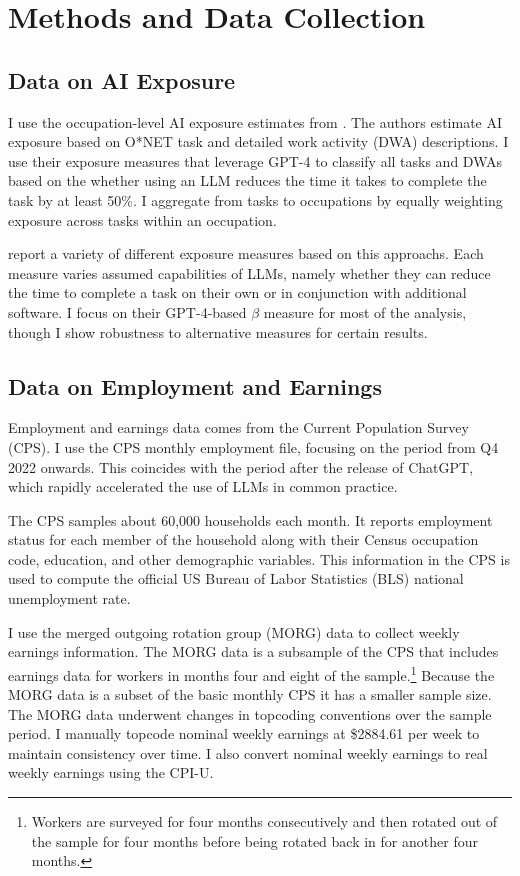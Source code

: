 \documentclass[12pt]{article}
\numberwithin{equation}{section}
\theoremstyle{theorem}\newcustomtheorem{theorem}{{\bf\sc Theorem}}
\theoremstyle{definition}\newcustomtheorem{assumption}{{\bf\sc Assumption}}
\theoremstyle{theorem} \newcustomtheorem{proposition}{{\bf\sc Proposition}}
\begin{document}
\section{Methods and Data Collection} 

\subsection{Data on AI Exposure}

I use the occupation-level AI exposure estimates from \citet{eloundou_gpts_2023}. The authors estimate AI exposure based on O*NET task and detailed work activity (DWA) descriptions. I use their exposure measures that leverage GPT-4 to classify all tasks and DWAs based on the whether using an LLM reduces the time it takes to complete the task by at least 50\%. I aggregate from tasks to occupations by equally weighting exposure across tasks within an occupation. 

\citet{eloundou_gpts_2023} report a variety of different exposure measures based on this approachs. Each measure varies assumed capabilities of LLMs, namely whether they can reduce the time to complete a task on their own or in conjunction with additional software. I focus on their GPT-4-based $\beta$ measure for most of the analysis, though I show robustness to alternative measures for certain results.  

\subsection{Data on Employment and Earnings}

Employment and earnings data comes from the Current Population Survey (CPS). I use the CPS monthly employment file, focusing on the period from Q4 2022 onwards. This coincides with the period after the release of ChatGPT, which rapidly accelerated the use of LLMs in common practice. 

The CPS samples about 60,000 households each month. It reports employment status for each member of the household along with their Census occupation code, education, and other demographic variables. This information in the CPS is used to compute the official US Bureau of Labor Statistics (BLS) national unemployment rate. 

I use the merged outgoing rotation group (MORG) data to collect weekly earnings information. The MORG data is a subsample of the CPS that includes earnings data for workers in months four and eight of the sample.\footnote{Workers are surveyed for four months consecutively and then rotated out of the sample for four months before being rotated back in for another four months. } Because the MORG data is a subset of the basic monthly CPS it has a smaller sample size. The MORG data underwent changes in topcoding conventions over the sample period. I manually topcode nominal weekly earnings at \$2884.61 per week to maintain consistency over time. I also convert nominal weekly earnings to real weekly earnings using the CPI-U.
\end{document}
